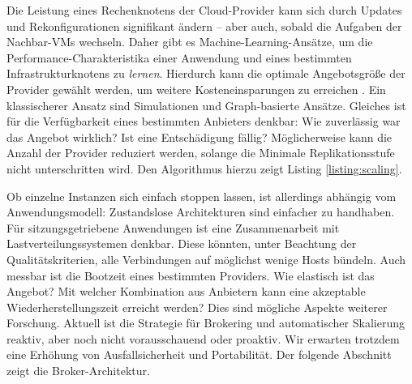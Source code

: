 Die Leistung eines Rechenknotens der Cloud-Provider kann sich durch Updates und Rekonfigurationen signifikant ändern -- aber auch, sobald die Aufgaben der Nachbar-VMs wechseln. Daher gibt es Machine-Learning-Ansätze, um die Performance-Charakteristika einer Anwendung und eines bestimmten Infrastrukturknotens zu \emph{lernen}. Hierdurch kann die optimale Angebotsgröße der Provider gewählt werden, um weitere Kosteneinsparungen zu erreichen \cite{grozev:2016:ml-brokering}. Ein klassischerer Ansatz sind Simulationen und Graph-basierte Ansätze. Gleiches ist für die Verfügbarkeit eines bestimmten Anbieters denkbar: Wie zuverlässig war das Angebot wirklich? Ist eine Entschädigung fällig? Möglicherweise kann die Anzahl der Provider reduziert werden, solange die Minimale Replikationsstufe nicht unterschritten wird. Den Algorithmus hierzu zeigt Listing \autoref{listing:scaling}.

Ob einzelne Instanzen sich einfach stoppen lassen, ist allerdings abhängig vom Anwendungsmodell: Zustandslose Architekturen sind einfacher zu handhaben. Für sitzungsgetriebene Anwendungen ist eine Zusammenarbeit mit Lastverteilungssystemen denkbar. Diese könnten, unter Beachtung der Qualitätskriterien, alle Verbindungen auf möglichst wenige Hosts bündeln. Auch messbar ist die Bootzeit eines bestimmten Providers. Wie elastisch ist das Angebot? Mit welcher Kombination aus Anbietern kann eine akzeptable Wiederherstellungszeit erreicht werden? Dies sind mögliche Aspekte weiterer Forschung. Aktuell ist die Strategie für Brokering und automatischer Skalierung reaktiv, aber noch nicht vorausschauend oder proaktiv. Wir erwarten trotzdem eine Erhöhung von Ausfallsicherheit und Portabilität. Der folgende Abschnitt zeigt die Broker-Architektur.
